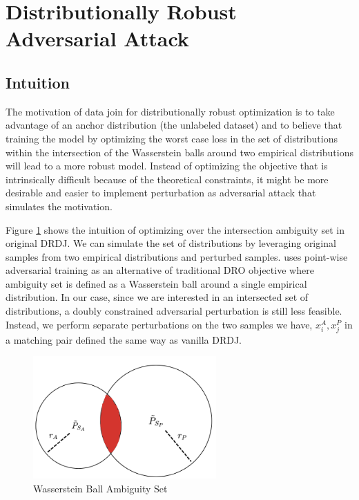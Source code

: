 \documentclass{article}
\begin{document}
\section{Distributionally Robust Adversarial Attack}
\subsection{Intuition}
The motivation of data join for distributionally robust optimization is to take advantage of 
an anchor distribution (the unlabeled dataset) and to believe that training the model by 
optimizing the worst case loss in the set of distributions within the intersection of 
the Wasserstein balls around two empirical distributions will lead to a more robust 
model. Instead of optimizing the objective that is intrinsically difficult because of 
the theoretical constraints, it might be more desirable and easier to implement perturbation
as adversarial attack that simulates the motivation.

Figure \ref{fig:wasserstein_ball} shows the intuition of optimizing over the intersection ambiguity set 
in original DRDJ. We can simulate the set of distributions by leveraging original samples from 
two empirical distributions and perturbed samples. \citep{Staib2017DistributionallyRD}
uses point-wise adversarial training as an alternative of traditional DRO objective 
where ambiguity set is defined as a Wasserstein ball around a single empirical distribution. 
In our case, since we are interested in an intersected set of distributions, a doubly 
constrained adversarial perturbation is still less feasible. Instead, we perform separate
perturbations on the two samples we have, $x_i^A, x_j^P$ in a matching pair defined 
the same way as vanilla DRDJ.

\begin{figure}
  \centering
  \includegraphics[width=7cm]{plots/wasserstein_ball.png}
  \caption{Wasserstein Ball Ambiguity Set}%
  \label{fig:wasserstein_ball}%
\end{figure}
\end{document}
